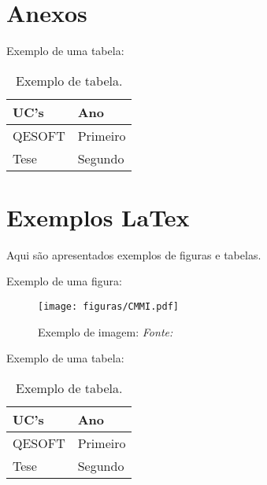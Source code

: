 \documentclass[openany,10pt,a4paper]{article}
\begin{document}
\begin{appendix}

\section*{Anexos}\label{ConteudoAnexos}

Exemplo de uma tabela:\\

\begin{table}[h]
	\centering
	\caption{Exemplo de tabela.}
	\begin{tabular}{p{1.5in}p{1.5in}}		
		\toprule
	
		\textbf{UC's}  & 	 \textbf{Ano} \\ 
		\midrule
		QESOFT & Primeiro \\
		Tese & Segundo \\
		\bottomrule
	\end{tabular} 
	\label{tab:tabela1}
\end{table}

\section*{Exemplos LaTex}\label{ExemplosLatex}
Aqui são apresentados exemplos de figuras e tabelas.

Exemplo de uma figura:\\

\begin{figure}[h]
	\centering
	\texttt{[image: figuras/CMMI.pdf]}
	\caption{Exemplo de imagem: \small{\textit{Fonte: 	\cite{CMMI2010}}}}
	\label{fig:figura1}
\end{figure}


Exemplo de uma tabela:\\

\begin{table}[h]
	\centering
	\caption{Exemplo de tabela.}
	\begin{tabular}{p{1.5in}p{1.5in}}		
		\toprule
	
		\textbf{UC's}  & 	 \textbf{Ano} \\ 
		\midrule
		QESOFT & Primeiro \\
		Tese & Segundo \\
		\bottomrule
	\end{tabular} 
	\label{tab:tabela1}
\end{table}

\end{appendix}
\end{document}
